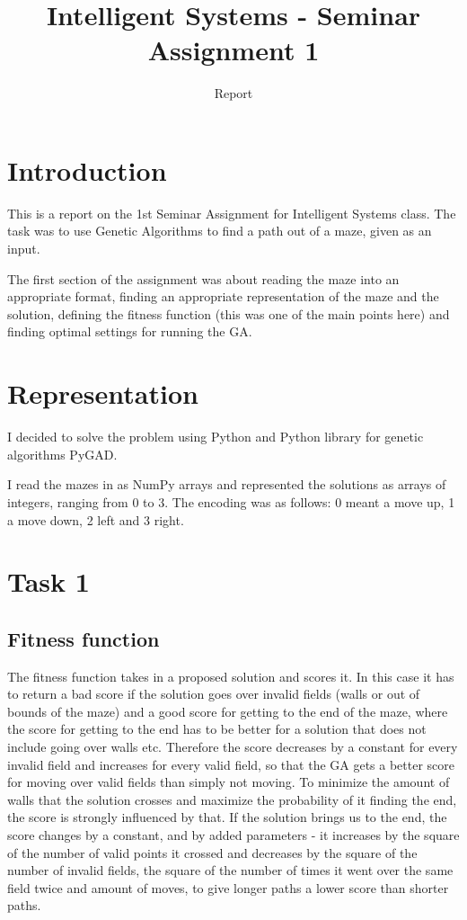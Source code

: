 \documentclass{article}
\title{Intelligent Systems - Seminar Assignment 1}
\author{Report}
\begin{document}
\maketitle

\section{Introduction}
This is a report on the 1st Seminar Assignment for Intelligent Systems class. The task was to use Genetic Algorithms to find a path out of a maze, given as an input.

The first section of the assignment was about reading the maze into an appropriate format, finding an appropriate representation of the maze and the solution, defining the fitness function (this was one of the main points here) and finding optimal settings for running the GA.

\section{Representation}
I decided to solve the problem using Python and Python library for genetic algorithms PyGAD.

I read the mazes in as NumPy arrays and represented the solutions as arrays of integers, ranging from 0 to 3. The encoding was as follows: 0 meant a move up, 1 a move down, 2 left and 3 right.

\section{Task 1}

\subsection{Fitness function}
The fitness function takes in a proposed solution and scores it. In this case it has to return a bad score if the solution goes over invalid fields (walls or out of bounds of the maze) and a good score for getting to the end of the maze, where the score for getting to the end has to be better for a solution that does not include going over walls etc. Therefore the score decreases by a constant for every invalid field and increases for every valid field, so that the GA gets a better score for moving over valid fields than simply not moving. To minimize the amount of walls that the solution crosses and maximize the probability of it finding the end, the score is strongly influenced by that. If the solution brings us to the end, the score changes by a constant, and by added parameters - it increases by the square of the number of valid points it crossed and decreases by the square of the number of invalid fields, the square of the number of times it went over the same field twice and amount of moves, to give longer paths a lower score than shorter paths. 
\end{document}
